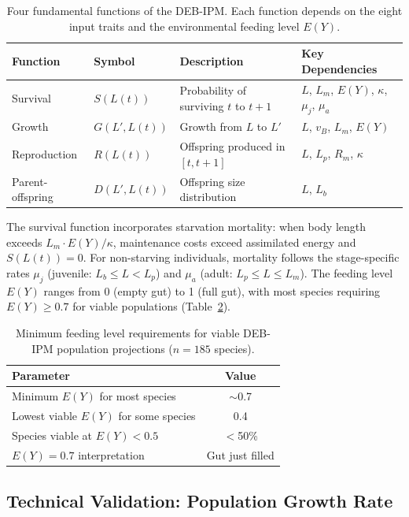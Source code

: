 \documentclass[11pt]{article}
\begin{document}
\begin{table}[H]
\centering
\caption{Four fundamental functions of the DEB-IPM. Each function depends on the eight input traits and the environmental feeding level $E(Y)$.}
\label{tab:functions}
\begin{tabular}{llll}
\toprule
\textbf{Function} & \textbf{Symbol} & \textbf{Description} & \textbf{Key Dependencies} \\
\midrule
Survival & $S(L(t))$ & Probability of surviving $t$ to $t+1$ & $L$, $L_m$, $E(Y)$, $\kappa$, $\mu_j$, $\mu_a$ \\
Growth & $G(L', L(t))$ & Growth from $L$ to $L'$ & $L$, $v_B$, $L_m$, $E(Y)$ \\
Reproduction & $R(L(t))$ & Offspring produced in $[t, t+1]$ & $L$, $L_p$, $R_m$, $\kappa$ \\
Parent-offspring & $D(L', L(t))$ & Offspring size distribution & $L$, $L_b$ \\
\bottomrule
\end{tabular}
\end{table}

The survival function incorporates starvation mortality: when body length exceeds $L_m \cdot E(Y) / \kappa$, maintenance costs exceed assimilated energy and $S(L(t)) = 0$. For non-starving individuals, mortality follows the stage-specific rates $\mu_j$ (juvenile: $L_b \leq L < L_p$) and $\mu_a$ (adult: $L_p \leq L \leq L_m$). The feeding level $E(Y)$ ranges from 0 (empty gut) to 1 (full gut), with most species requiring $E(Y) \geq 0.7$ for viable populations (Table~\ref{tab:feeding}).

\begin{table}[H]
\centering
\caption{Minimum feeding level requirements for viable DEB-IPM population projections ($n = 185$ species).}
\label{tab:feeding}
\begin{tabular}{lc}
\toprule
\textbf{Parameter} & \textbf{Value} \\
\midrule
Minimum $E(Y)$ for most species & $\sim$0.7 \\
Lowest viable $E(Y)$ for some species & 0.4 \\
Species viable at $E(Y) < 0.5$ & $<$50\% \\
$E(Y) = 0.7$ interpretation & Gut just filled \\
\bottomrule
\end{tabular}
\end{table}

\subsection{Technical Validation: Population Growth Rate}
\end{document}
